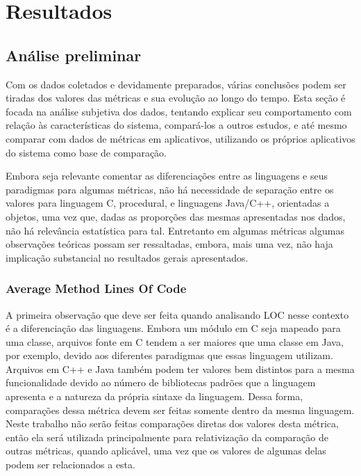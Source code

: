 \chapter{Resultados}
\label{cap:resultados}


\section{Análise preliminar}

Com os dados coletados e devidamente preparados, várias conclusões podem ser tiradas dos valores das métricas e sua evolução ao longo do tempo. Esta seção é focada na análise subjetiva dos dados, tentando explicar seu comportamento com relação às características do sistema, compará-los a outros estudos, e até mesmo comparar com dados de métricas em aplicativos, utilizando os próprios aplicativos do sistema como base de comparação.

Embora seja relevante comentar as diferenciações entre as linguagens e seus paradigmas para algumas métricas,  não há necessidade de separação entre os valores para linguagem C, procedural, e linguagens Java/C++, orientadas a objetos, uma vez que, dadas as proporções das mesmas apresentadas nos dados, não há relevância estatística para tal. Entretanto em algumas métricas algumas observações teóricas possam ser ressaltadas, embora, mais uma vez, não haja implicação substancial no resultados gerais apresentados.

\subsection{Average Method Lines Of Code}

A primeira observação que deve ser feita quando analisando LOC nesse contexto é a diferenciação das linguagens. Embora um módulo em C seja mapeado para uma classe, arquivos fonte em C tendem a ser maiores que uma classe em Java, por exemplo, devido aos diferentes paradigmas que essas linguagem utilizam. Arquivos em C++ e Java também podem ter valores bem distintos para a mesma funcionalidade devido ao número de bibliotecas padrões que a linguagem apresenta e a natureza da própria sintaxe da linguagem. Dessa forma, comparações dessa métrica devem ser feitas somente dentro da mesma linguagem. Neste trabalho não serão feitas comparações diretas dos valores desta métrica, então ela será utilizada principalmente para relativização da comparação de outras métricas, quando aplicável, uma vez que os valores de algumas delas podem ser relacionados a esta. 

